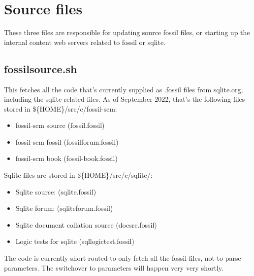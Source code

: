 \documentclass[11pt]{article}
\begin{document}
\setcounter{tocdepth}{2}
\tableofcontents

\newpage

\section*{Source files}
\label{sec:org57d56bf}
These three files are responsible for updating source fossil files, or starting up the internal
content web servers related to fossil or sqlite.

\subsection*{fossilsource.sh}
\label{sec:org9b5a113}
This fetches all the code that's currently supplied as .fossil files from sqlite.org, including
the sqlite-related files.
As of September 2022, that's the following files stored in \$\{HOME\}/src/c/fossil-scm:
\begin{itemize}
\item fossil-scm source (fossil.fossil)
\item fossil-scm fossil (fossilforum.fossil)
\item fossil-scm book (fossil-book.fossil)
\end{itemize}

Sqlite files are stored in \$\{HOME\}/src/c/sqlite/:
\begin{itemize}
\item Sqlite source: (sqlite.fossil)
\item Sqlite forum: (sqliteforum.fossil)
\item Sqlite document collation source (docsrc.fossil)
\item Logic tests for sqlite (sqllogictest.fossil)
\end{itemize}

The code is currently short-routed to only fetch all the fossil files, not to parse parameters.
The switchover to parameters will happen very very shortly.
\end{document}
